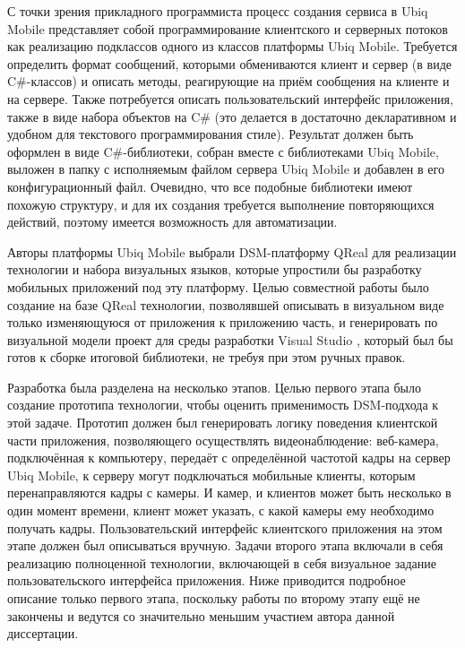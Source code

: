 С точки зрения прикладного программиста процесс создания сервиса в Ubiq Mobile представляет 
собой программирование клиентского и серверных потоков как реализацию подклассов одного 
из классов платформы Ubiq Mobile. Требуется определить формат сообщений, которыми 
обмениваются клиент и сервер (в виде C\#-классов) и описать методы, реагирующие на 
приём сообщения на клиенте и на сервере. Также потребуется описать пользовательский 
интерфейс приложения, также в виде набора объектов на C\# (это делается в достаточно 
декларативном и удобном для текстового программирования стиле). Результат должен быть 
оформлен в виде C\#-библиотеки, собран вместе с библиотеками Ubiq Mobile, выложен в 
папку с исполняемым файлом сервера Ubiq Mobile и добавлен в его конфигурационный файл. 
Очевидно, что все подобные библиотеки имеют похожую структуру, и для их создания требуется 
выполнение повторяющихся действий, поэтому имеется возможность для автоматизации.

Авторы платформы Ubiq Mobile выбрали DSM-платформу QReal для реализации технологии 
и набора визуальных языков, которые упростили бы разработку мобильных приложений под 
эту платформу. Целью совместной работы было создание на базе QReal технологии, позволявшей 
описывать в визуальном виде только изменяющуюся от приложения к приложению часть, и 
генерировать по визуальной модели проект для среды разработки Visual Studio%
, который был бы готов к сборке итоговой библиотеки, не требуя при этом ручных правок. 

Разработка была разделена на несколько этапов. Целью первого этапа было создание прототипа 
технологии, чтобы оценить применимость DSM-подхода к этой задаче. Прототип должен 
был генерировать логику поведения клиентской части приложения, позволяющего осуществлять 
видеонаблюдение: веб-камера, подключённая к компьютеру, передаёт с определённой частотой 
кадры на сервер Ubiq Mobile, к серверу могут подключаться мобильные клиенты, которым 
перенаправляются кадры с камеры. И камер, и клиентов может быть несколько в один момент 
времени, клиент может указать, с какой камеры ему необходимо получать кадры. 
Пользовательский интерфейс клиентского приложения на этом этапе должен был описываться 
вручную. Задачи второго этапа включали в себя реализацию полноценной технологии, включающей 
в себя визуальное задание пользовательского интерфейса приложения. Ниже приводится 
подробное описание только первого этапа, поскольку работы по второму этапу ещё не 
закончены и ведутся со значительно меньшим участием автора данной диссертации.


